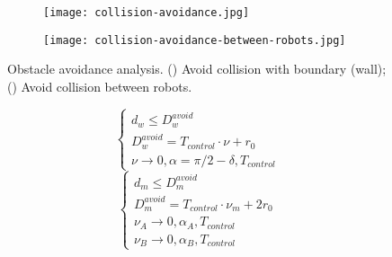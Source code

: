 \begin{figure}[h]
    \centering
    \begin{subfigure}{0.4\textwidth}
        \centering
        \texttt{[image: collision-avoidance.jpg]}
        \caption{\label{figure:Avoid collision with boundary}}
    \end{subfigure}
    \begin{subfigure}{0.4\textwidth}
        \centering
        \texttt{[image: collision-avoidance-between-robots.jpg]}
        \caption{\label{figure:Avoid collision between robots}}
    \end{subfigure}
    \caption{Obstacle avoidance analysis. () Avoid
    collision with boundary (wall); () Avoid
    collision between robots.}
    \label{figure:obstacle avoidance analysis}
\end{figure}
\begin{equation}\label{eq:configuration of robot movement parameters}
    \begin{cases}
        d_w\leq D_w^{avoid} \\
        D_w^{avoid} = T_{control}\cdot \nu +r_0 \\
        \nu \rightarrow 0, \alpha=\pi/2-\delta, T_{control}
    \end{cases}
\end{equation}
\begin{equation}\label{eq:configuration2 of robot movement parameters}
    \begin{cases}
        d_m\leq D_m^{avoid} \\
        D_m^{avoid} = T_{control}\cdot \nu_m + 2r_0 \\
        \nu_A \rightarrow 0, \alpha_A, T_{control} \\
        \nu_B \rightarrow 0, \alpha_B, T_{control}
    \end{cases}
\end{equation}


